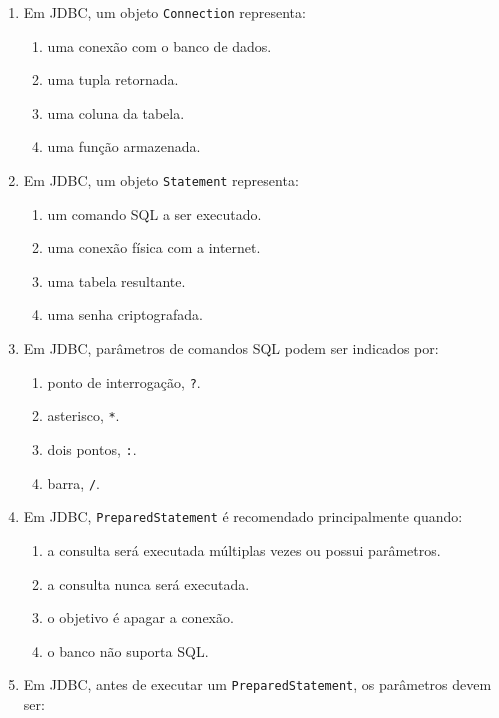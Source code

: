 \documentclass[12pt,a4paper]{article}
\begin{document}
\begin{enumerate}[label=\textbf{Q\arabic*.}]
\item Em JDBC, um objeto \texttt{Connection} representa:

\begin{enumerate}[label=\alph*)]
    \item uma conexão com o banco de dados.
    \item uma tupla retornada.
    \item uma coluna da tabela.
    \item uma função armazenada.
\end{enumerate}

\item Em JDBC, um objeto \texttt{Statement} representa:

\begin{enumerate}[label=\alph*)]
    \item um comando SQL a ser executado.
    \item uma conexão física com a internet.
    \item uma tabela resultante.
    \item uma senha criptografada.
\end{enumerate}

\item Em JDBC, parâmetros de comandos SQL podem ser indicados por:

\begin{enumerate}[label=\alph*)]
    \item ponto de interrogação, \texttt{?}.
    \item asterisco, \texttt{*}.
    \item dois pontos, \texttt{:}.
    \item barra, \texttt{/}.
\end{enumerate}

\item Em JDBC, \texttt{PreparedStatement} é recomendado principalmente quando:

\begin{enumerate}[label=\alph*)]
    \item a consulta será executada múltiplas vezes ou possui parâmetros.
    \item a consulta nunca será executada.
    \item o objetivo é apagar a conexão.
    \item o banco não suporta SQL.
\end{enumerate}

\item Em JDBC, antes de executar um \texttt{PreparedStatement}, os parâmetros devem ser:


\end{enumerate}
\end{document}
